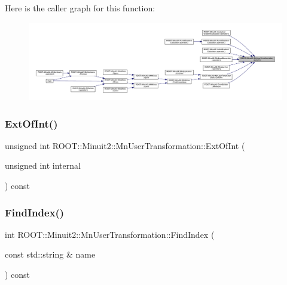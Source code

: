 Here is the caller graph for this function\+:\nopagebreak
\begin{figure}[H]
\begin{center}
\leavevmode
\includegraphics[width=350pt]{d9/d98/classROOT_1_1Minuit2_1_1MnUserTransformation_a114bf6d4e97b6f8bf5f3788e30e63002_icgraph}
\end{center}
\end{figure}
\mbox{\label{classROOT_1_1Minuit2_1_1MnUserTransformation_a114bf6d4e97b6f8bf5f3788e30e63002}} 
\subsubsection{\texorpdfstring{ExtOfInt()}{ExtOfInt()}\hspace{0.1cm}{\footnotesize\ttfamily [2/2]}}
{\footnotesize\ttfamily unsigned int R\+O\+O\+T\+::\+Minuit2\+::\+Mn\+User\+Transformation\+::\+Ext\+Of\+Int (\begin{DoxyParamCaption}\item[{unsigned int}]{internal }\end{DoxyParamCaption}) const\hspace{0.3cm}{\ttfamily [inline]}}

\mbox{\label{classROOT_1_1Minuit2_1_1MnUserTransformation_a9bccf4b65c979cb6b959f8fb787f676a}} 
\subsubsection{\texorpdfstring{FindIndex()}{FindIndex()}\hspace{0.1cm}{\footnotesize\ttfamily [1/2]}}
{\footnotesize\ttfamily int R\+O\+O\+T\+::\+Minuit2\+::\+Mn\+User\+Transformation\+::\+Find\+Index (\begin{DoxyParamCaption}\item[{const std\+::string \&}]{name }\end{DoxyParamCaption}) const}

